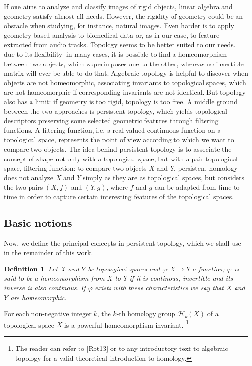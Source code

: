 \documentclass[english, LaM, oneside, noexaminfo]{sapthesis}
\newtheorem{defin}{\bf Definition}[section]
\begin{document}
 If one aims to analyze and classify images of rigid objects, linear algebra and geometry satisfy almost all needs. However, the rigidity of geometry could be an obstacle when studying, for instance, natural  images. Even harder is to apply geometry-based analysis to biomedical data or, as in our case, to feature extracted from audio tracks. Topology seems to be better suited to our needs, due to its flexibility: in many cases, it is possible to find a homeomorphism between two objects, which superimposes one to the other, whereas no invertible matrix will ever be able to do that. Algebraic topology is helpful to discover when objects are not homeomorphic, associating invariants to topological spaces, which are not homeomorphic if corresponding invariants are not identical. But topology also has a limit: if geometry is too rigid, topology is too free. A middle ground between the two approaches is persistent topology, which yields topological descriptors preserving some selected geometric features through filtering functions. A filtering function, i.e. a real-valued continuous function on a topological space, represents the point of view according to which we want to compare two objects. The idea behind persistent topology is to associate the concept of shape not only with a topological space, but with a pair topological space, filtering function: to compare two objects $X$ and $Y$, persistent homology does not analyze $X$ and $Y$ simply as they are as topological spaces, but considers the two pairs $(X, f)$ and $(Y, g)$, where $f$ and $g$ can be adapted from time to time in order to capture certain interesting features of the topological spaces.

\subsection{Basic notions}

Now, we define the principal concepts in persistent topology, which we shall use in the remainder of this work.
\begin{defin} Let $X$ and $Y$ be topological spaces and $\varphi : X {\rightarrow} Y $ a function; $\varphi$ is said to be a \textit{homeomorphism} from $X$ to $Y$ if it is continous, invertible and its inverse is also continous. If $\varphi$ exists with these characteristics we say that $X$ and $Y$ are \textit{homeomorphic}.   \end{defin}

For each non-negative integer $k$, the $k$-th homology group $\mathcal{H}_k(X)$ of a topological space $X$ is a powerful homeomorphism invariant. \footnote{The reader can refer to [Rot13] or to any introductory text to algebraic topology for a valid theoretical introduction to homology.} 
\end{document}
